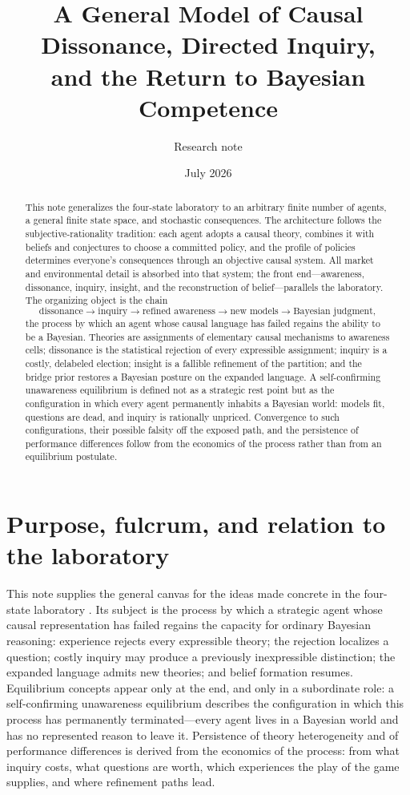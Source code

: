 \documentclass[11pt]{article}
\title{A General Model of Causal Dissonance, Directed Inquiry,\\
and the Return to Bayesian Competence}
\author{Research note}
\date{July 2026}
\begin{document}
\maketitle

\begin{abstract}
This note generalizes the four-state laboratory to an arbitrary finite number
of agents, a general finite state space, and stochastic consequences.  The
architecture follows the subjective-rationality tradition: each agent adopts a
causal theory, combines it with beliefs and conjectures to choose a committed
policy, and the profile of policies determines everyone's consequences through
an objective causal system.  All market and environmental detail is absorbed
into that system; the front end---awareness, dissonance, inquiry, insight, and
the reconstruction of belief---parallels the laboratory.  The organizing
object is the chain
\[
\text{dissonance}\longrightarrow\text{inquiry}\longrightarrow
\text{refined awareness}\longrightarrow\text{new models}\longrightarrow
\text{Bayesian judgment},
\]
the process by which an agent whose causal language has failed regains the
ability to be a Bayesian.  Theories are assignments of elementary causal
mechanisms to awareness cells; dissonance is the statistical rejection of
every expressible assignment; inquiry is a costly, delabeled election; insight
is a fallible refinement of the partition; and the bridge prior restores a
Bayesian posture on the expanded language.  A self-confirming unawareness
equilibrium is defined not as a strategic rest point but as the configuration
in which every agent permanently inhabits a Bayesian world: models fit,
questions are dead, and inquiry is rationally unpriced.  Convergence to such
configurations, their possible falsity off the exposed path, and the
persistence of performance differences follow from the economics of the
process rather than from an equilibrium postulate.
\end{abstract}

\section{Purpose, fulcrum, and relation to the laboratory}
\label{sec:purpose}

This note supplies the general canvas for the ideas made concrete in the
four-state laboratory \citep{FourStateNote}.  Its subject is the process by
which a strategic agent whose causal representation has failed regains the
capacity for ordinary Bayesian reasoning: experience rejects every expressible
theory; the rejection localizes a question; costly inquiry may produce a
previously inexpressible distinction; the expanded language admits new
theories; and belief formation resumes.  Equilibrium concepts appear only at
the end, and only in a subordinate role: a self-confirming unawareness
equilibrium describes the configuration in which this process has permanently
terminated---every agent lives in a Bayesian world and has no represented
reason to leave it.  Persistence of theory heterogeneity and of performance
differences is derived from the economics of the process: from what inquiry
costs, what questions are worth, which experiences the play of the game
supplies, and where refinement paths lead.
\end{document}
